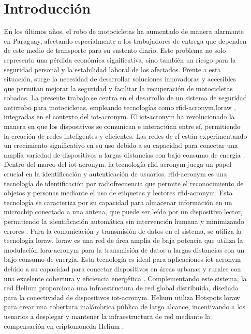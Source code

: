 \fancyhead{}
\fancyfoot{}

\chapter{Introducción}
En los últimos años, el robo de motocicletas ha aumentado de manera alarmante en Paraguay, afectando especialmente a los trabajadores de entrega que dependen de este medio de transporte para su sustento diario. Este problema no solo representa una pérdida económica significativa, sino también un riesgo para la seguridad personal y la estabilidad laboral de los afectados. Frente a esta situación, surge la necesidad de desarrollar soluciones innovadoras y accesibles que permitan mejorar la seguridad y facilitar la recuperación de motocicletas robadas.
La presente trabajo se centra en el desarrollo de un sistema de seguridad antirrobo para motocicletas, empleando tecnologías como \gls{rfid-acronym},\gls{loraw} , integradas en el contexto del \gls{iot-acronym}. 
El \acrshort{iot-acronym} ha revolucionado la manera en que los dispositivos se comunican e interactúan entre sí, permitiendo la creación de redes inteligentes y eficientes. Las redes de \gls{rf} están experimentando un crecimiento significativo en su uso debido a su capacidad para conectar una amplia variedad de dispositivos a largas distancias con bajo consumo de energía \cite{8550722}.
Dentro del marco del \acrshort{iot-acronym}, la tecnología \acrshort{rfid-acronym} juega un papel crucial en la identificación y autenticación de usuarios. \acrshort{rfid-acronym} es una tecnología de identificación por radiofrecuencia que permite el reconocimiento de objetos y personas mediante el uso de etiquetas y lectores \acrshort{rfid-acronym}. Esta tecnología se caracteriza por su capacidad para almacenar información en un microchip conectado a una antena, que puede ser leído por un dispositivo lector, permitiendo la identificación automática sin intervención humana y minimizando errores \cite{RFidtech}.
Para la comunicación y transmisión de datos en el sistema, se utiliza la tecnología \acrshort{loraw}. \acrshort{loraw} es una red de área amplia de baja potencia que utiliza la modulación \gls{lora-acronym} para la transmisión de datos a largas distancias con un bajo consumo de energía. Esta tecnología es ideal para aplicaciones \acrshort{iot-acronym} debido a su capacidad para conectar dispositivos en áreas urbanas y rurales con una excelente cobertura y eficiencia energética \cite{doc_whatislorawan}.
Complementando este sistema, la red Helium proporciona una infraestructura de red global distribuida, diseñada para la conectividad de dispositivos \acrshort{iot-acronym}. Helium utiliza Hotspots \acrshort{loraw} para crear una cobertura inalámbrica pública de largo alcance, incentivando a los usuarios a desplegar y mantener la infraestructura de red mediante la compensación en criptomoneda Helium \cite{heliumDocs}.
